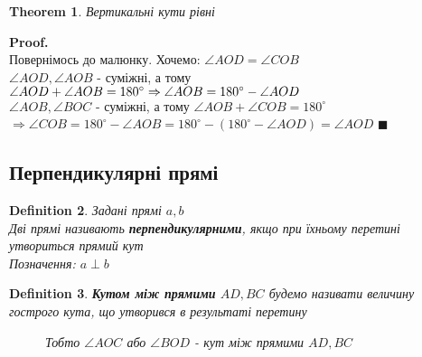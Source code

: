 \documentclass[a4paper, 14pt]{extarticle}
\theoremstyle{theoremdd}
\newtheorem{theorem}{Theorem}[subsection]
\theoremstyle{theoremdd}
\newtheorem{definition}[theorem]{Definition}
\theoremstyle{theoremdd}
\theoremstyle{theoremdd}
\theoremstyle{theoremdd}
\theoremstyle{theoremdd}
\theoremstyle{theoremdd}
\theoremstyle{theoremdd}
\newenvironment{pf}{\vspace*{-3mm} \textbf{Proof. \\}}{$\blacksquare$}
\begin{document}
\begin{theorem}
Вертикальні кути рівні
\end{theorem}

\begin{pf}
Повернімось до малюнку. Хочемо: $\angle AOD = \angle COB$\\
$\angle AOD, \angle AOB$ - суміжні, а тому $\angle AOD + \angle AOB = 180^{\circ} \\ \Rightarrow \angle AOB = 180^{\circ} - \angle AOD$\\
$\angle AOB, \angle BOC$ - суміжні, а тому $\angle AOB + \angle COB = 180^{\circ}$\\
$\Rightarrow \angle COB = 180^{\circ} - \angle AOB = 180^{\circ} - (180^{\circ} - \angle AOD) = \angle AOD$
\end{pf}

\subsection{Перпендикулярні прямі}
\begin{definition}
Задані прямі $a,b$\\
Дві прямі називають \textbf{перпендикулярними}, якщо при їхньому перетині утвориться прямий кут\\
Позначення: $a \perp b$
\begin{figure}[H]
\centering
{}
\end{figure}
\end{definition}

\begin{definition}
\textbf{Кутом між прямими} $AD,BC$ будемо називати величину гострого кута, що утворився в результаті перетину
\begin{figure}[H]
\centering
{}
\caption*{Тобто $\angle AOC$ або $\angle BOD$ - кут між прямими $AD,BC$}
\end{figure}
\end{definition}
\end{document}
